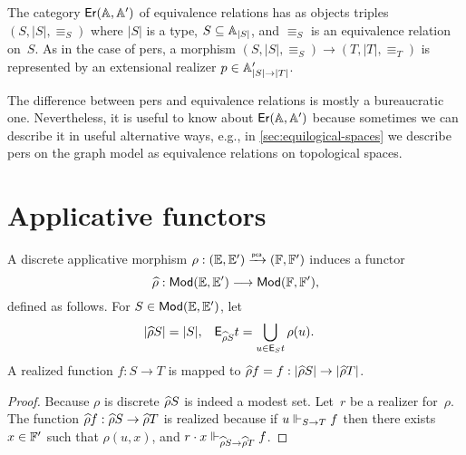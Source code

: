 The category $\mathsf{Er}(\mathbb{A}, \mathbb{A}')$ of equivalence relations has as objects triples $(S, |S|, {\equiv_S})$ where $|S|$ is a
type, $S \subseteq \mathbb{A}_{|S|}$, and $\equiv_S$ is an equivalence relation on~$S$. As in the case of pers, a morphism
$(S, |S|, {\equiv_S}) \to (T, |T|, {\equiv_T})$ is represented by an extensional realizer
$p \in \mathbb{A}'_{|S| \to |T|}$.

The difference between pers and equivalence relations is mostly a
bureaucratic one. Nevertheless, it is useful to know about $\mathsf{Er}(\mathbb{A},
  \mathbb{A}')$ because sometimes we can describe it in useful
alternative ways, e.g., in \cref{sec:equilogical-spaces} we
describe pers on the graph model as equivalence relations on
topological spaces.

\section{Applicative functors}
\label{sec:applicative-functors}

\begin{proposition}
  \label{th:applicative_morphism_induce_functor}%
  A discrete applicative morphism $\rho: ({\mathbb{E}}, {\mathbb{E}'}) \xrightarrow{\scriptscriptstyle\mathsf{pca}}{} ({\mathbb{F}},
  {\mathbb{F}'})$ induces a functor
  \begin{equation*}
     \widehat{\rho}: \mathsf{Mod}({\mathbb{E}}, {\mathbb{E}'}) \longrightarrow \mathsf{Mod}({\mathbb{F}}, {\mathbb{F}'}),
  \end{equation*}
  defined as follows. For $S \in \mathsf{Mod}({\mathbb{E}}, {\mathbb{E}'})$, let
  \begin{align*}
    |\widehat{\rho} S| &= |S|,
    &
    \mathsf{E}_{\widehat{\rho} S} t &= \bigcup_{u \in \mathsf{E}_S t} \rho(u).
  \end{align*}
  A realized function $f: S \to T$ is mapped to $\widehat{\rho} f = f:
  |\widehat{\rho} S| \to |\widehat{\rho} T|$.
\end{proposition}

\begin{proof}
  Because $\rho$ is discrete $\widehat{\rho} S$ is indeed a modest set.
  Let~$r$ be a realizer for~$\rho$. The function $\widehat{\rho} f :
  \widehat{\rho} S \to \widehat{\rho} T$ is realized because if $u \Vdash_{S \to T}
  f$ then there exists $x \in {\mathbb{F}'}$ such that $\rho(u, x)$, and $r
  \cdot x \Vdash_{\widehat{\rho} S \to \widehat{\rho} T} f$.
\end{proof}

